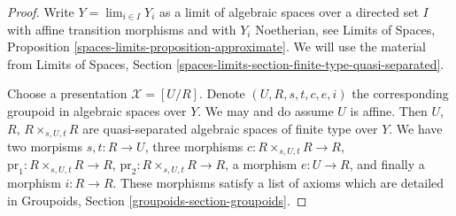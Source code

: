 \begin{proof}
Write $Y = \lim_{i \in I} Y_i$ as a limit of algebraic spaces
over a directed set $I$ with affine transition morphisms and
with $Y_i$ Noetherian, see
Limits of Spaces, Proposition \ref{spaces-limits-proposition-approximate}.
We will use the material from
Limits of Spaces, Section
\ref{spaces-limits-section-finite-type-quasi-separated}.

\medskip\noindent
Choose a presentation $\mathcal{X} = [U/R]$.
Denote $(U, R, s, t, c, e, i)$ the corresponding groupoid
in algebraic spaces over $Y$. We may and do assume $U$ is affine.
Then $U$, $R$, $R \times_{s, U, t} R$ are quasi-separated
algebraic spaces of finite type over $Y$. We have two morpisms
$s, t : R \to U$, three morphisms
$c : R \times_{s, U, t} R \to R$,
$\text{pr}_1 : R \times_{s, U, t} R \to R$,
$\text{pr}_2 : R \times_{s, U, t} R \to R$,
a morphism $e : U \to R$, and finally a morphism $i : R \to R$.
These morphisms satisfy a list of axioms which are detailed
in Groupoids, Section \ref{groupoids-section-groupoids}.


\end{proof}
